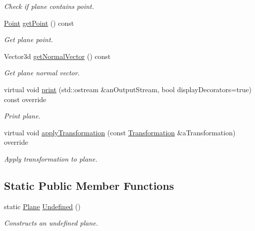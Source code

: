 \begin{DoxyCompactItemize}
\begin{DoxyCompactList}\small\item\em Check if plane contains point. \end{DoxyCompactList}\item 
\hyperlink{classlibrary_1_1math_1_1geom_1_1d3_1_1objects_1_1_point}{Point} \hyperlink{classlibrary_1_1math_1_1geom_1_1d3_1_1objects_1_1_plane_a52f9167ca123019c4b303c19b696b886}{get\+Point} () const
\begin{DoxyCompactList}\small\item\em Get plane point. \end{DoxyCompactList}\item 
Vector3d \hyperlink{classlibrary_1_1math_1_1geom_1_1d3_1_1objects_1_1_plane_a9d34608a389d4c80dad6b6f58b82c0e4}{get\+Normal\+Vector} () const
\begin{DoxyCompactList}\small\item\em Get plane normal vector. \end{DoxyCompactList}\item 
virtual void \hyperlink{classlibrary_1_1math_1_1geom_1_1d3_1_1objects_1_1_plane_a2e43e82344b57898606f5c13ffc9dcc9}{print} (std\+::ostream \&an\+Output\+Stream, bool display\+Decorators=true) const override
\begin{DoxyCompactList}\small\item\em Print plane. \end{DoxyCompactList}\item 
virtual void \hyperlink{classlibrary_1_1math_1_1geom_1_1d3_1_1objects_1_1_plane_ab3474aef2e9f8dd4f9e86da017522487}{apply\+Transformation} (const \hyperlink{classlibrary_1_1math_1_1geom_1_1d3_1_1_transformation}{Transformation} \&a\+Transformation) override
\begin{DoxyCompactList}\small\item\em Apply transformation to plane. \end{DoxyCompactList}\end{DoxyCompactItemize}
\subsection*{Static Public Member Functions}
\begin{DoxyCompactItemize}
\item 
static \hyperlink{classlibrary_1_1math_1_1geom_1_1d3_1_1objects_1_1_plane}{Plane} \hyperlink{classlibrary_1_1math_1_1geom_1_1d3_1_1objects_1_1_plane_a582c0e5930dd4a458c557c866b0dae17}{Undefined} ()
\begin{DoxyCompactList}\small\item\em Constructs an undefined plane. \end{DoxyCompactList}\end{DoxyCompactItemize}


